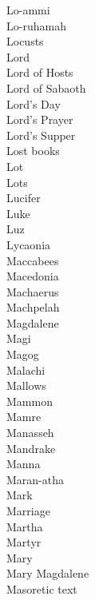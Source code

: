 Lo-ammi  \\
Lo-ruhamah  \\
Locusts  \\
Lord  \\
Lord of Hosts  \\
Lord of Sabaoth  \\
Lord’s Day  \\
Lord’s Prayer  \\
Lord’s Supper  \\
Lost books  \\
Lot  \\
Lots  \\
Lucifer  \\
Luke  \\
Luz  \\
Lycaonia  \\
Maccabees  \\
Macedonia  \\
Machaerus  \\
Machpelah  \\
Magdalene  \\
Magi  \\
Magog  \\
Malachi  \\
Mallows  \\
Mammon  \\
Mamre  \\
Manasseh  \\
Mandrake  \\
Manna  \\
Maran-atha  \\
Mark  \\
Marriage  \\
Martha  \\
Martyr  \\
Mary  \\
Mary Magdalene  \\
Masoretic text  \\
